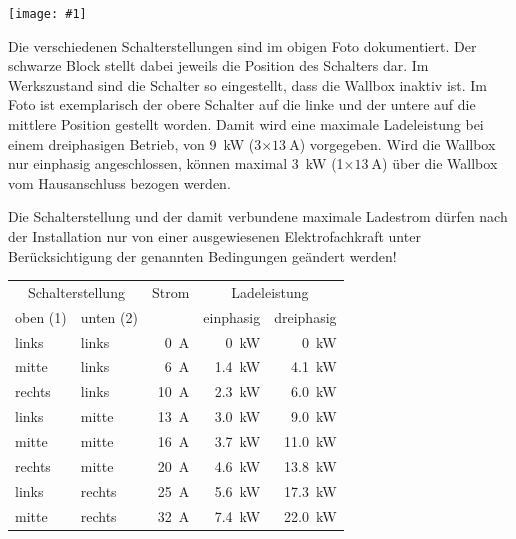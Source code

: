 \documentclass[a4paper,10pt]{article}
\newcommand{\hint}[1]{\begin{tcolorbox}[colback=boxgray,colframe=black,coltext=
white,title=Hinweis,left*=2mm,right*=2mm,boxsep=1mm,bottom=1mm,top=1mm]#1\end{tcolorbox}}
\newcommand{\gfx}[1]{\texttt{[image: \#1]}}
\begin{document}
\begin{multicols*}{2}
    \gfx{./img_warp2/resized/warp2_current_configure_w_caption_600}

    Die verschiedenen Schalterstellungen sind im obigen Foto dokumentiert.
    Der schwarze Block stellt dabei jeweils die Position
    des Schalters dar. Im Werkszustand sind die Schalter so eingestellt,
    dass die Wallbox inaktiv ist. Im Foto ist exemplarisch der obere
    Schalter auf die linke und der untere auf die mittlere Position gestellt
    worden. Damit wird eine maximale Ladeleistung bei einem dreiphasigen
    Betrieb, von \SI{9}{\kilo\watt} (3$\times\SI{13}{\ampere}$) vorgegeben.
    Wird die Wallbox nur einphasig angeschlossen, können maximal
    \SI{3}{\kilo\watt} (1$\times\SI{13}{\ampere}$) über die Wallbox vom Hausanschluss
    bezogen werden.

    \hint{Die Schalterstellung und der damit verbundene maximale Ladestrom dürfen nach der
          Installation nur von einer ausgewiesenen Elektrofachkraft unter
          Berücksichtigung der genannten Bedingungen geändert werden!}

    \begin{tabular}{lp{}rrr}
        \toprule
        \multicolumn{2}{c}{Schalterstellung} & Strom            & \multicolumn{2}{c}{Ladeleistung}             \\
        \small{oben (1)} & \small{unten (2)} &                  & \small{einphasig}    & \small{dreiphasig}    \\
        \midrule
        links            & links             & \SI{0}{\ampere}  & \SI{0}{\kilo\watt}   & \SI{0}{\kilo\watt}    \\
        mitte            & links             & \SI{6}{\ampere}  & \SI{1.4}{\kilo\watt} & \SI{4.1}{\kilo\watt}  \\
        rechts           & links             & \SI{10}{\ampere} & \SI{2.3}{\kilo\watt} & \SI{6.0}{\kilo\watt}  \\
        links            & mitte             & \SI{13}{\ampere} & \SI{3.0}{\kilo\watt} & \SI{9.0}{\kilo\watt}  \\
        mitte            & mitte             & \SI{16}{\ampere} & \SI{3.7}{\kilo\watt} & \SI{11.0}{\kilo\watt} \\
        rechts           & mitte             & \SI{20}{\ampere} & \SI{4.6}{\kilo\watt} & \SI{13.8}{\kilo\watt} \\
        links            & rechts            & \SI{25}{\ampere} & \SI{5.6}{\kilo\watt} & \SI{17.3}{\kilo\watt} \\
        mitte            & rechts            & \SI{32}{\ampere} & \SI{7.4}{\kilo\watt} & \SI{22.0}{\kilo\watt} \\
        \bottomrule
    \end{tabular}


\end{multicols*}
\end{document}
